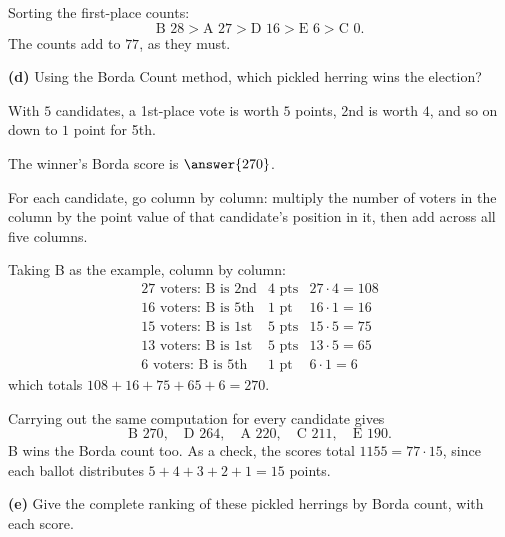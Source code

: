 \documentclass[12pt]{ximera}
\begin{document}
\begin{problem}
\begin{prompt}
\begin{feedback}
Sorting the first-place counts:
\[ \text{B }28 > \text{A }27 > \text{D }16 > \text{E }6 > \text{C }0. \]
The counts add to $77$, as they must. \checkmark
\end{feedback}
\end{prompt}

\begin{prompt}
\textbf{(d)} Using the Borda Count method, which pickled herring wins the election?

With $5$ candidates, a 1st-place vote is worth $5$ points, 2nd is worth $4$, and so on
down to $1$ point for 5th.

\begin{multipleChoice}
\end{multipleChoice}

The winner's Borda score is $\answer{270}$.

\begin{hint}
For each candidate, go column by column: multiply the number of voters in the column
by the point value of that candidate's position in it, then add across all five
columns.
\end{hint}

\begin{feedback}
Taking B as the example, column by column:
\[
\begin{array}{lll}
\text{27 voters: B is 2nd} & 4\text{ pts} & 27\cdot 4 = 108\\
\text{16 voters: B is 5th} & 1\text{ pt}  & 16\cdot 1 = 16\\
\text{15 voters: B is 1st} & 5\text{ pts} & 15\cdot 5 = 75\\
\text{13 voters: B is 1st} & 5\text{ pts} & 13\cdot 5 = 65\\
\text{6 voters: B is 5th}  & 1\text{ pt}  & 6\cdot 1 = 6
\end{array}
\]
which totals $108+16+75+65+6 = 270$.

Carrying out the same computation for every candidate gives
\[
\text{B } 270, \quad \text{D } 264, \quad \text{A } 220, \quad \text{C } 211, \quad \text{E } 190.
\]
B wins the Borda count too. As a check, the scores total $1155 = 77\cdot 15$, since
each ballot distributes $5+4+3+2+1=15$ points.
\end{feedback}
\end{prompt}

\begin{prompt}
\textbf{(e)} Give the complete ranking of these pickled herrings by Borda count, with
each score.


\end{prompt}
\end{problem}
\end{document}
